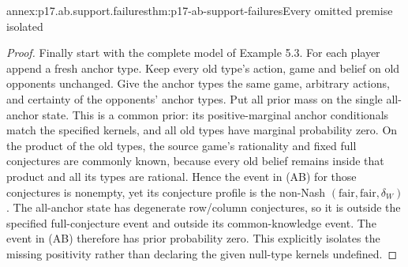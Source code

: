 \begin{annexitem}{annex:p17.ab.support.failures}{thm:p17-ab-support-failures}{Every omitted premise isolated}
\begin{proof}
Finally start with the complete model of Example 5.3.
For each player append a fresh anchor type. Keep every old
type's action, game and belief on old opponents unchanged.
Give the anchor types the same game, arbitrary actions,
and certainty of the opponents' anchor types. Put all prior
mass on the single all-anchor state. This is a common prior:
its positive-marginal anchor conditionals match the specified
kernels, and all old types have marginal probability zero.
On the product of the old types, the source game's rationality
and fixed full conjectures are commonly known, because every
old belief remains inside that product and all its types
are rational. Hence the event in (AB) for those conjectures
is nonempty, yet its conjecture profile is the non-Nash
\((\text{fair},\text{fair},\delta_W)\).
The all-anchor state has degenerate row/column conjectures,
so it is outside the specified full-conjecture event and
outside its common-knowledge event. The event in (AB)
therefore has prior probability zero. This explicitly
isolates the missing positivity rather than declaring
the given null-type kernels undefined.
\end{proof}
\end{annexitem}

